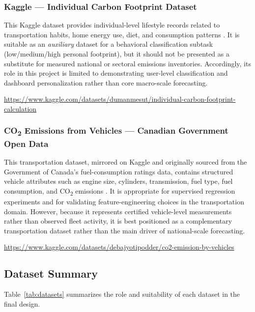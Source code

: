 \documentclass[conference]{IEEEtran}
\begin{document}
\subsubsection{Kaggle — Individual Carbon Footprint Dataset}
This Kaggle dataset provides individual-level lifestyle records related to transportation habits, home energy use, diet, and consumption patterns \cite{kaggle_carbon}. It is suitable as an \textit{auxiliary} dataset for a behavioral classification subtask (low/medium/high personal footprint), but it should not be presented as a substitute for measured national or sectoral emissions inventories. Accordingly, its role in this project is limited to demonstrating user-level classification and dashboard personalization rather than core macro-scale forecasting.
\begin{center}
\url{https://www.kaggle.com/datasets/dumanmesut/individual-carbon-footprint-calculation}
\end{center}

\subsubsection{CO\textsubscript{2} Emissions from Vehicles — Canadian Government Open Data}
This transportation dataset, mirrored on Kaggle and originally sourced from the Government of Canada's fuel-consumption ratings data, contains structured vehicle attributes such as engine size, cylinders, transmission, fuel type, fuel consumption, and CO\textsubscript{2} emissions \cite{vehicles_co2}. It is appropriate for supervised regression experiments and for validating feature-engineering choices in the transportation domain. However, because it represents certified vehicle-level measurements rather than observed fleet activity, it is best positioned as a complementary transportation dataset rather than the main driver of national-scale forecasting.
\begin{center}
\url{https://www.kaggle.com/datasets/debajyotipodder/co2-emission-by-vehicles}
\end{center}

\subsection{Dataset Summary}
Table~\ref{tab:datasets} summarizes the role and suitability of each dataset in the final design.
\end{document}
